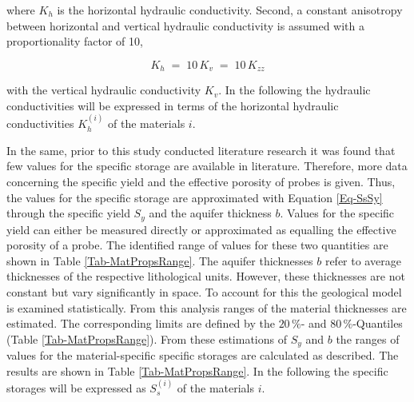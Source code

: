 \noindent where $K_h$ is the horizontal hydraulic conductivity. 
Second, a constant anisotropy between horizontal and vertical hydraulic conductivity is assumed with a proportionality factor of 10,

\begin{equation}
    K_h \; = \; 10 \, K_v \; = \; 10 \, K_{zz}
\end{equation}

\noindent with the vertical hydraulic conductivity $K_v$. 
In the following the hydraulic conductivities will be expressed in terms of the horizontal hydraulic conductivities $K_{h}^{(i)}$ of the materials $i$.

In the same, prior to this study conducted literature research it was found that few values for the specific storage are available in literature. 
Therefore, more data concerning the specific yield and the effective porosity of probes is given. 
Thus, the values for the specific storage are approximated with Equation \eqref{Eq-SsSy} through the specific yield $S_y$ and the aquifer thickness $b$. 
Values for the specific yield can either be measured directly or approximated as equalling the effective porosity of a probe. 
The identified range of values for these two quantities are shown in Table \ref{Tab-MatPropsRange}. 
The aquifer thicknesses $b$ refer to average thicknesses of the respective lithological units. 
However, these thicknesses are not constant but vary significantly in space. 
To account for this the geological model is examined statistically. 
From this analysis ranges of the material thicknesses are estimated. 
The corresponding limits are defined by the $20 \, \%$- and $80 \, \%$-Quantiles (Table \ref{Tab-MatPropsRange}). 
From these estimations of $S_y$ and $b$ the ranges of values for the material-specific specific storages are calculated as described. 
The results are shown in Table \ref{Tab-MatPropsRange}. 
In the following the specific storages will be expressed as $S_{s}^{(i)}$ of the materials $i$. 

